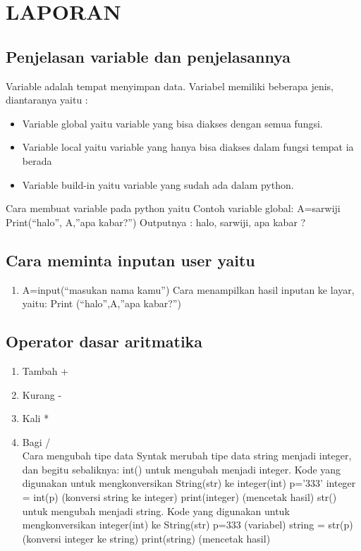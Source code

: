 \chapter*{LAPORAN}

\section{Penjelasan variable dan penjelasannya }
\par
Variable adalah tempat menyimpan data. Variabel memiliki beberapa jenis, diantaranya yaitu :
\begin{itemize}
\item   Variable global yaitu variable yang bisa  diakses dengan semua fungsi.
\item	Variable local yaitu variable yang hanya bisa diakses dalam fungsi tempat ia berada
\item   Variable build-in yaitu variable yang sudah ada dalam python. 
\end{itemize}
Cara membuat variable pada python yaitu 
Contoh variable global:
A=sarwiji
Print(“halo”, A,”apa kabar?”)
Outputnya : halo, sarwiji, apa kabar ?
\section{Cara meminta inputan user yaitu}
\begin{enumerate}
\item 
A=input(“masukan nama kamu”)
Cara menampilkan hasil inputan ke layar, yaitu:
Print (“halo”,A,”apa kabar?”)
\end{enumerate}
\section{Operator dasar aritmatika}
\begin{enumerate}
\item   Tambah	    	+
\item   Kurang			-
\item   Kali			*
\item   Bagi			/\\
Cara mengubah tipe data 
Syntak merubah tipe data string menjadi integer, dan begitu sebaliknya:
int() untuk mengubah menjadi integer.
Kode yang digunakan untuk mengkonversikan String(str) ke integer(int)
p=’333’
integer = int(p) (konversi string ke integer)
print(integer) (mencetak hasil)
str() untuk mengubah menjadi string.
Kode yang digunakan untuk mengkonversikan integer(int) ke String(str)
p=333 (variabel) 
string = str(p) (konversi integer ke string) 
print(string) (mencetak hasil) 
\end{enumerate}
